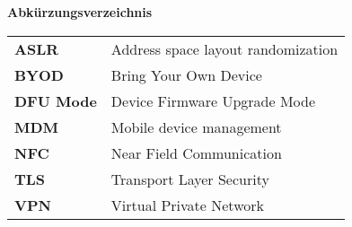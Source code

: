 %
%
% 
% 
% 

\begin{center}
{\Large\bfseries Abkürzungsverzeichnis}
\end{center}

\begin{table*}[htbp]
		\begin{tabular}{ll}
		     \textbf{ASLR} & Address space layout randomization \\
		     \textbf{BYOD} & Bring Your Own Device\\
		     \textbf{DFU Mode} & Device Firmware Upgrade Mode\\
		     \textbf{MDM} & Mobile device management \\
		     \textbf{NFC} & Near Field Communication \\
 		     \textbf{TLS}  & Transport Layer Security \\
 		 	 \textbf{VPN} & Virtual Private Network \\
		\end{tabular}
\end{table*}